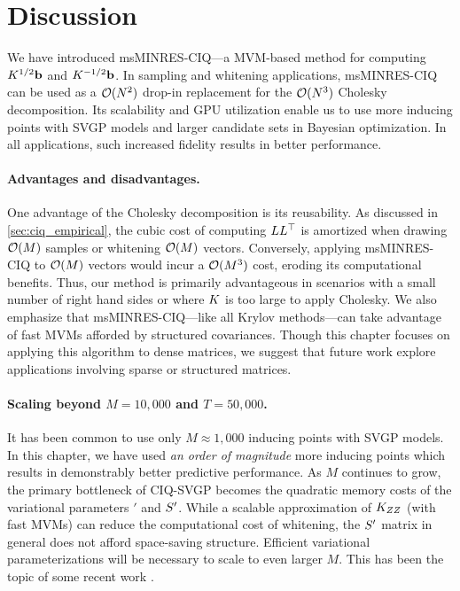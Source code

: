 \section{Discussion}

We have introduced msMINRES-CIQ---a MVM-based method for computing $K^{1/2} \mathbf{b}$ and $K^{-1/2} \mathbf{b}$.
In sampling and whitening applications, msMINRES-CIQ can be used as a $\bigo{N^2}$ drop-in replacement for the $\bigo{N^3}$ Cholesky decomposition.
Its scalability and GPU utilization enable us to use more inducing points with SVGP models and larger candidate sets in Bayesian optimization.
In all applications, such increased fidelity results in better performance.


\paragraph{Advantages and disadvantages.}
One advantage of the Cholesky decomposition is its reusability.
As discussed in \cref{sec:ciq_empirical}, the cubic cost of computing $L L^\top$ is amortized when drawing $\bigo{M}$ samples or whitening $\bigo{M}$ vectors.
Conversely, applying msMINRES-CIQ to $\bigo{M}$ vectors would incur a $\bigo{M^3}$ cost, eroding its computational benefits. Thus, our method is primarily advantageous
in scenarios with a small number of right hand sides or where $K$ is too large to apply Cholesky.
We also emphasize that msMINRES-CIQ---like all Krylov methods---can take advantage of fast MVMs afforded by structured covariances.
Though this chapter focuses on applying this algorithm to dense matrices, we suggest that future work explore applications involving sparse or structured matrices.


\paragraph{Scaling beyond $M=10,\!000$ and $T=50,\!000$.}
It has been common to use only $M\approx1,\!000$ inducing points with SVGP models.
In this chapter, we have used \emph{an order of magnitude} more inducing points which results in demonstrably better predictive performance.
As $M$ continues to grow, the primary bottleneck of CIQ-SVGP becomes the quadratic memory costs of the variational parameters $\bm'$ and $S'$.
While a scalable approximation of $K_{ZZ}$ (with fast MVMs) can reduce the computational cost of whitening, the $S'$ matrix in general does not afford space-saving structure.
Efficient variational parameterizations will be necessary to scale to even larger $M$.
This has been the topic of some recent work \cite{wilson2016stochastic,cheng2017variational,salimbeni2018orthogonally,shi2019sparse}.

